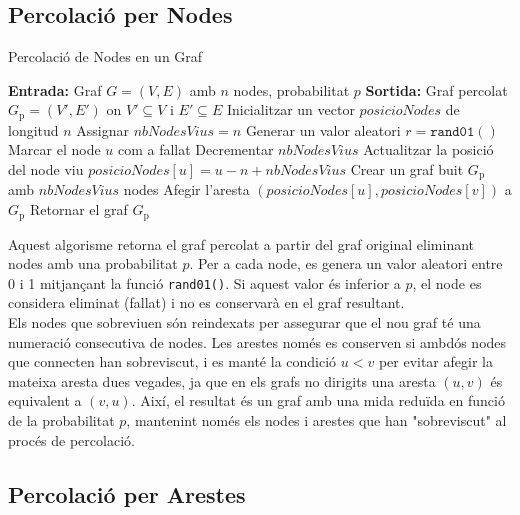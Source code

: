 \documentclass[a4paper]{article}
\begin{document}
	\subsection{Percolació per Nodes}
	
	\begin{algorithm} [H]
		\caption{Percolació de Nodes en un Graf}
		\begin{algorithmic} [1]
			\Statex \textbf{Entrada:} Graf $G = (V, E)$ amb $n$ nodes, probabilitat $p$
			\Statex \textbf{Sortida:} Graf percolat $G_{\text{p}} = (V', E')$ on $V' \subseteq V$ i $E' \subseteq E$
			\Statex \vspace{-0.25em}
			\State Inicialitzar un vector $posicioNodes$ de longitud $n$
			\State Assignar $nbNodesVius = n$
			\State Generar un valor aleatori $r = \texttt{rand01}()$
			\State Marcar el node $u$ com a fallat
			\State Decrementar $nbNodesVius$
			\Else
			\State Actualitzar la posició del node viu $posicioNodes[u] = u - n + nbNodesVius$
			\EndIf
			\EndFor
			\Statex
			\State Crear un graf buit $G_{\text{p}}$ amb $nbNodesVius$ nodes
			\State Afegir l'aresta $(posicioNodes[u], posicioNodes[v])$ a $G_{\text{p}}$
			\EndIf
			\EndFor
			\EndIf
			\EndFor
			\State Retornar el graf $G_{\text{p}}$
		\end{algorithmic}
	\end{algorithm}
	
	Aquest algorisme retorna el graf percolat a partir del graf original eliminant nodes amb una probabilitat $p$. Per a cada node, es genera un valor aleatori entre 0 i 1 mitjançant la funció \texttt{rand01()}. Si aquest valor és inferior a $p$, el node es considera eliminat (fallat) i no es conservarà en el graf resultant. \\
	
	Els nodes que sobreviuen són reindexats per assegurar que el nou graf té una numeració consecutiva de nodes. Les arestes només es conserven si ambdós nodes que connecten han sobreviscut, i es manté la condició $u<v$ per evitar afegir la mateixa aresta dues vegades, ja que en els grafs no dirigits una aresta $(u,v)$ és equivalent a $(v,u)$. Així, el resultat és un graf amb una mida reduïda en funció de la probabilitat $p$, mantenint només els nodes i arestes que han "sobreviscut" al procés de percolació.

	\subsection{Percolació per Arestes}
	
\end{document}
